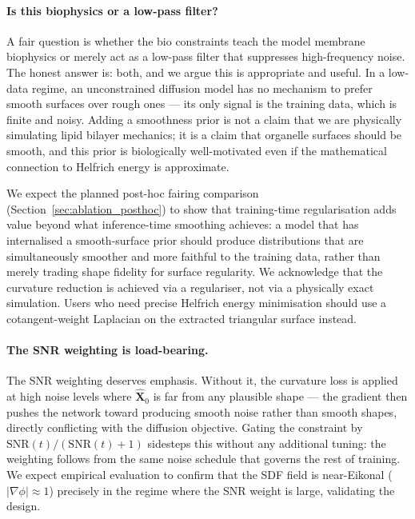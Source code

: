 \documentclass[10pt, a4paper, twocolumn]{article}
\begin{document}
\paragraph{Is this biophysics or a low-pass filter?}
A fair question is whether the bio constraints teach the model membrane biophysics or merely act as a low-pass filter that suppresses high-frequency noise. The honest answer is: both, and we argue this is appropriate and useful. In a low-data regime, an unconstrained diffusion model has no mechanism to prefer smooth surfaces over rough ones — its only signal is the training data, which is finite and noisy. Adding a smoothness prior is not a claim that we are physically simulating lipid bilayer mechanics; it is a claim that organelle surfaces should be smooth, and this prior is biologically well-motivated even if the mathematical connection to Helfrich energy is approximate.

We expect the planned post-hoc fairing comparison (Section~\ref{sec:ablation_posthoc}) to show that training-time regularisation adds value beyond what inference-time smoothing achieves: a model that has internalised a smooth-surface prior should produce distributions that are simultaneously smoother and more faithful to the training data, rather than merely trading shape fidelity for surface regularity. We acknowledge that the curvature reduction is achieved via a regulariser, not via a physically exact simulation. Users who need precise Helfrich energy minimisation should use a cotangent-weight Laplacian on the extracted triangular surface instead.

\paragraph{The SNR weighting is load-bearing.}
The SNR weighting deserves emphasis. Without it, the curvature loss is applied at high noise levels where $\hat{\mathbf{X}}_0$ is far from any plausible shape — the gradient then pushes the network toward producing smooth noise rather than smooth shapes, directly conflicting with the diffusion objective. Gating the constraint by $\text{SNR}(t)/(\text{SNR}(t)+1)$ sidesteps this without any additional tuning: the weighting follows from the same noise schedule that governs the rest of training. We expect empirical evaluation to confirm that the SDF field is near-Eikonal ($|\nabla\phi| \approx 1$) precisely in the regime where the SNR weight is large, validating the design.
\end{document}

